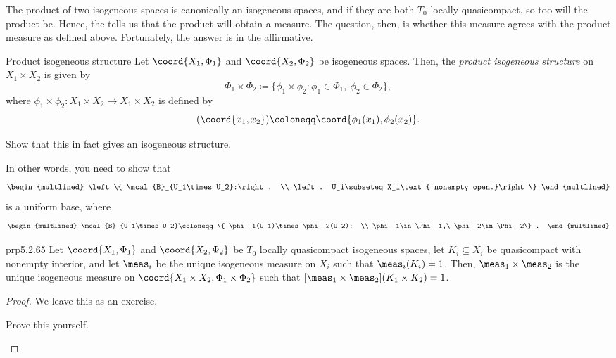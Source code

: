 The product of two isogeneous spaces is canonically an isogeneous spaces, and if they are both $T_0$ locally quasicompact, so too will the product be.  Hence, the  tells us that the product will obtain a measure.  The question, then, is whether this measure agrees with the product measure as defined above.  Fortunately, the answer is in the affirmative.
\begin{dfn}{Product isogeneous structure}{}
Let $\coord{X_1,\Phi _1}$ and $\coord{X_2,\Phi _2}$ be isogeneous spaces.  Then, the \emph{product isogeneous structure} on $X_1\times X_2$ is given by
\begin{equation}
\Phi _1\times \Phi _2\coloneqq \{ \phi _1\times \phi _2:\phi _1\in \Phi _1,\ \phi _2\in \Phi _2\},
\end{equation}
where $\phi _1\times \phi _2:X_1\times X_2\rightarrow X_1\times X_2$ is defined by
\begin{equation}
[\phi _1\times \phi _2](\coord{x_1,x_2})\coloneqq \coord{\phi _1(x_1),\phi _2(x_2)}.
\end{equation}
\begin{exr}[breakable=false]{}{}
Show that this in fact gives an isogeneous structure.
\begin{rmk}
In other words, you need to show that
\begin{equation}
\begin{multlined}
\left\{ \mcal{B}_{U_1\times U_2}:\right. \\ \left. U_i\subseteq X_i\text{ nonempty open.}\right\}
\end{multlined} 
\end{equation}
is a uniform base, where
\begin{equation}
\begin{multlined}
\mcal{B}_{U_1\times U_2}\coloneqq \{ \phi _1(U_1)\times \phi _2(U_2): \\ \phi _1\in \Phi _1,\ \phi _2\in \Phi _2\} .
\end{multlined}
\end{equation}
\end{rmk}
\end{exr}
\end{dfn}
\begin{prp}{}{prp5.2.65}
Let $\coord{X_1,\Phi _1}$ and $\coord{X_2,\Phi _2}$ be $T_0$ locally quasicompact isogeneous spaces, let $K_i\subseteq X_i$ be quasicompact with nonempty interior, and let $\meas _i$ be the unique isogeneous measure on $X_i$ such that $\meas _i(K_i)=1$.  Then, $\meas _1\times \meas _2$ is the unique isogeneous measure on $\coord{X_1\times X_2,\Phi _1\times \Phi _2}$ such that $[\meas _1\times \meas _2](K_1\times K_2)=1$.
\begin{proof}
We leave this as an exercise.
\begin{exr}[breakable=false]{}{}
Prove this yourself.
\end{exr}
\end{proof}
\end{prp}

